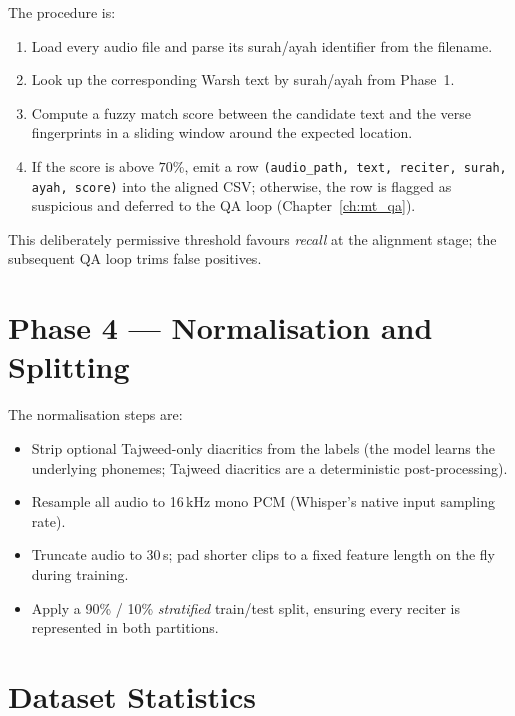 The procedure is:
\begin{enumerate}
  \item Load every audio file and parse its surah/ayah identifier from the
        filename.
  \item Look up the corresponding Warsh text by surah/ayah from Phase~1.
  \item Compute a fuzzy match score between the candidate text and the
        verse fingerprints in a sliding window around the expected
        location.
  \item If the score is above $70\%$, emit a row
        \texttt{(audio\_path, text, reciter, surah, ayah, score)} into the
        aligned CSV; otherwise, the row is flagged as suspicious and
        deferred to the QA loop (Chapter~\ref{ch:mt_qa}).
\end{enumerate}

This deliberately permissive threshold favours \emph{recall} at the
alignment stage; the subsequent QA loop trims false positives.

\section{Phase 4 --- Normalisation and Splitting}


The normalisation steps are:
\begin{itemize}
  \item Strip optional Tajweed-only diacritics from the labels (the model
        learns the underlying phonemes; Tajweed diacritics are a
        deterministic post-processing).
  \item Resample all audio to 16\,kHz mono PCM (Whisper's native input
        sampling rate).
  \item Truncate audio to 30\,s; pad shorter clips to a fixed feature
        length on the fly during training.
  \item Apply a 90\% / 10\% \emph{stratified} train/test split, ensuring
        every reciter is represented in both partitions.
\end{itemize}

\section{Dataset Statistics}

